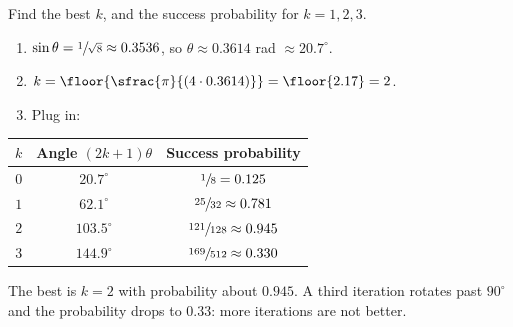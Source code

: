 
\begin{exercisebox}
\begin{pproblem}[$N = 8$, $a = 1$, and overshooting]\label{pp:grover8}
    Find the best $k$, and the success probability for $k = 1, 2, 3$.
\end{pproblem}
\tcblower
\begin{wsolution}
    \leavevmode
    \begin{enumerate}
        \item $\sin\theta = \sfrac{1}{\sqrt{8}} \approx 0.3536$, so
              $\theta \approx 0.3614$ rad $\approx 20.7^\circ$.
        \item $k = \floor{\sfrac{\pi}{(4 \cdot 0.3614)}} = \floor{2.17} = 2$.
        \item Plug in:
    \end{enumerate}
    \begin{center}
        \begin{tabular}{ccc}
            \toprule
            $k$ & Angle $(2k+1)\theta$ & Success probability                \\ \midrule
            $0$ & $20.7^\circ$         & $\sfrac{1}{8} = 0.125$             \\
            $1$ & $62.1^\circ$         & $\sfrac{25}{32} \approx 0.781$     \\
            $2$ & $103.5^\circ$        & $\sfrac{121}{128} \approx 0.945$   \\
            $3$ & $144.9^\circ$        & $\sfrac{169}{512} \approx 0.330$   \\ \bottomrule
        \end{tabular}
    \end{center}
    The best is $k = 2$ with probability about $0.945$. A third iteration rotates past $90^\circ$
    and the probability drops to $0.33$: more iterations are not better.
\end{wsolution}
\end{exercisebox}

